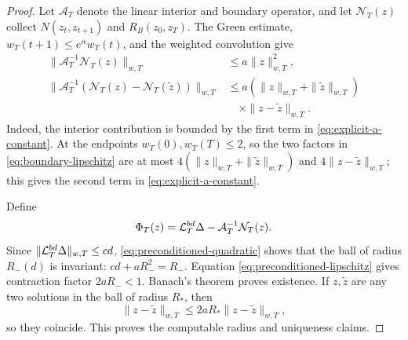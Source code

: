 \documentclass[twocolumn,nameyear,amsthm]{autart}
\numberwithin{equation}{section}
\begin{document}
\begin{proof}
Let $\mathcal A_T$ denote the linear interior and boundary operator, and let
$\mathcal N_T(z)$ collect $N(z_t,z_{t+1})$ and $R_B(z_0,z_T)$.  The Green
estimate, $w_T(t+1)\le e^\alpha w_T(t)$, and the weighted convolution give
\begin{align}
 \|\mathcal A_T^{-1}\mathcal N_T(z)\|_{w,T}
 &\le a\|z\|_{w,T}^2,\label{eq:preconditioned-quadratic}\\
 \|\mathcal A_T^{-1}(\mathcal N_T(z)-\mathcal N_T(\tilde z))\|_{w,T}
 &\le a(\|z\|_{w,T}+\|\tilde z\|_{w,T})\nonumber\\
 &\quad\times\|z-\tilde z\|_{w,T}.
 \label{eq:preconditioned-lipschitz}
\end{align}
Indeed, the interior contribution is bounded by the first term in
\eqref{eq:explicit-a-constant}.  At the endpoints
$w_T(0),w_T(T)\le2$, so the two factors in
\eqref{eq:boundary-lipschitz} are at most
$4(\|z\|_{w,T}+\|\tilde z\|_{w,T})$ and
$4\|z-\tilde z\|_{w,T}$; this gives the second
term in \eqref{eq:explicit-a-constant}.

Define
\[
 \Phi_T(z)=\mathcal L_T^{\rm bd}\Delta-
            \mathcal A_T^{-1}\mathcal N_T(z).
\]
Since $\|\mathcal L_T^{\rm bd}\Delta\|_{w,T}\le cd$,
\eqref{eq:preconditioned-quadratic} shows that the ball of radius $R_-(d)$
is invariant: $cd+aR_-^2=R_-$.  Equation
\eqref{eq:preconditioned-lipschitz} gives contraction factor
$2aR_-<1$.  Banach's theorem proves existence.  If $z,\tilde z$ are any two
solutions in the ball of radius $R_*$, then
\[
 \|z-\tilde z\|_{w,T}\le2aR_*\|z-\tilde z\|_{w,T},
\]
so they coincide.  This proves the computable radius and uniqueness claims.


\end{proof}
\end{document}
